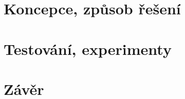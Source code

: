 \documentclass[11pt, a4paper]{article}
\begin{document}
\section{Koncepce, způsob řešení}

\section{Testování, experimenty}

\section{Závěr}



    
\end{document}
